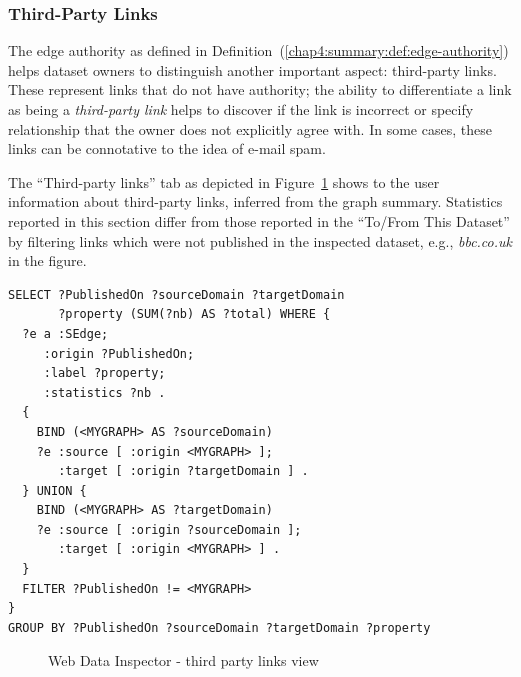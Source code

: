 \subsubsection{Third-Party Links}

The edge authority as defined in Definition~(\ref{chap4:summary:def:edge-authority}) helps dataset owners to distinguish another important aspect: third-party links. These represent links that do not have authority; the ability to differentiate a link as being a \emph{third-party link} helps to discover if the link is incorrect or specify relationship that the owner does not explicitly agree with. In some cases, these links can be connotative to the idea of e-mail spam.

The ``Third-party links'' tab as depicted in Figure~\ref{fig:wdi:thirdPartyLinks} shows to the user information about third-party links, inferred from the graph summary.
Statistics reported in this section differ from those reported in the ``To/From This Dataset'' by filtering links which were not published in the inspected dataset, e.g., \emph{bbc.co.uk} in the figure.

\begin{verbatim}
SELECT ?PublishedOn ?sourceDomain ?targetDomain
       ?property (SUM(?nb) AS ?total) WHERE {
  ?e a :SEdge;
     :origin ?PublishedOn;
     :label ?property;
     :statistics ?nb .
  {
    BIND (<MYGRAPH> AS ?sourceDomain)
    ?e :source [ :origin <MYGRAPH> ];
       :target [ :origin ?targetDomain ] .
  } UNION {
    BIND (<MYGRAPH> AS ?targetDomain)
    ?e :source [ :origin ?sourceDomain ];
       :target [ :origin <MYGRAPH> ] .
  }
  FILTER ?PublishedOn != <MYGRAPH>
}
GROUP BY ?PublishedOn ?sourceDomain ?targetDomain ?property
\end{verbatim}

\begin{figure}
	\centering
	\caption{Web Data Inspector - third party links view}
	\label{fig:wdi:thirdPartyLinks}
\end{figure}

